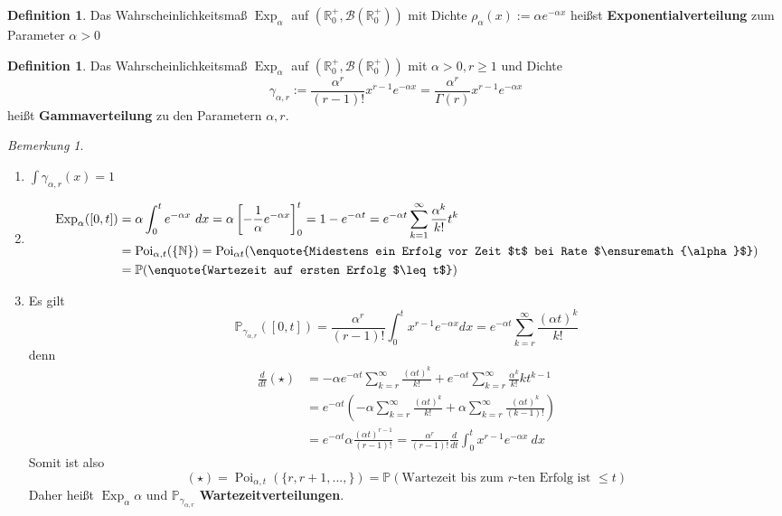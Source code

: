 \documentclass[10pt,a4paper]{article}
\newcommand{\N}{\ensuremath{\mathbb{N}}}
\newcommand{\R}{\ensuremath{\mathbb{R}}}
\newcommand{\al}{\ensuremath{\alpha}}
\newcommand{\Bor}{\mathscr B}
\newcommand{\Prb}{\mathbb P}
\newcommand{\Poi}{\operatorname{Poi}}
\newcommand{\Exp}{\operatorname{Exp}}
\theoremstyle{plain}
\theoremstyle{definition}
\newtheorem{definition}[theorem]{Definition}
\theoremstyle{remark}
\newtheorem{bem}[theorem]{Bemerkung}
\begin{document}
	\begin{definition}
		Das Wahrscheinlichkeitsmaß $\Exp_\al$ auf $(\R_0^+,\Bor(\R_0^+))$ mit Dichte $\rho_\al(x):=\al e^{-\al x}$ heißst \textbf{Exponentialverteilung} zum Parameter $\al>0$
	\end{definition}

	\addtocounter{theorem}{-1}
	\begin{definition}
		Das Wahrscheinlichkeitsmaß $\Exp_\al$ auf $(\R_0^+,\Bor(\R_0^+))$ mit $\al>0,r\ge 1$ und Dichte 
		\[\gamma_{\al,r}:=\frac{\al^r}{(r-1)!}x^{r-1}e^{-\al x}=\frac{\al^r}{\Gamma(r)}x^{r-1}e^{-\al x}\]
		heißt \textbf{Gammaverteilung} zu den Parametern $\al,r$.
	\end{definition}
	
	\begin{bem}
		\begin{enumerate}[label=\alph*)]
			\item $\int\gamma_{\al,r}(x)=1$
			\item \begin{align*}
					\Exp_\al([0,t])&=\al\int_{0}^{t}e^{-\al x}~dx=\al\left[-\frac{1}{\al}e^{-\al x}\right]_{0}^t=1-e^{-\al t}=e^{-\al t}\sum_{k=1}^{\infty}\frac{\al^k}{k!}t^k\\
					&=\Poi_{\al,t}(\{\N\})=\Poi_{\al t}(\text{\enquote{Midestens ein Erfolg vor Zeit $t$ bei Rate $\al$}})\\
					&=\Prb(\text{\enquote{Wartezeit auf ersten Erfolg $\leq t$}})
				\end{align*}
			\item Es gilt \[\Prb_{\gamma_{\al,r}}([0,t])=\frac{\al^r}{(r-1)!}\int_{0}^{t}x^{r-1}e^{-\al x}dx=e^{-\al t}\sum_{k=r}^{\infty}\frac{(\al t)^k}{k!}\tag{\star}\]
			denn \begin{align*}
			\frac{d}{dt}(\star)&=-\al e^{-\al t}\sum_{k=r}^{\infty}\frac{(\al t)^k}{k!}+e^{-\al t}\sum_{k=r}^\infty\frac{\al^k}{k!}k t^{k-1}\\
			&=e^{-\al t}\left(-\al\sum_{k=r}^\infty\frac{(\al t)^k}{k!}+\al\sum_{k=r}^\infty\frac{(\al t)^k}{(k-1)!}\right)\\
			&=e^{-\al t}\al \frac{(\al t)^{r-1}}{(r-1)!}=\frac{\al^r}{(r-1)!}\frac{d}{dt}\int_{0}^{t}x^{r-1}e^{-\al x}~dx
			\end{align*}
			Somit ist also
			\[(\star)=\Poi_{\al,t}(\{r,r+1,...,\})=\Prb(\text{Wartezeit bis zum $r$-ten Erfolg ist $\leq t$})\]
			Daher heißt $\Exp_\al\al$ und $\Prb_{\gamma_{\al,r}}$ \textbf{Wartezeitverteilungen}.
		\end{enumerate}
	\end{bem}
\end{document}
